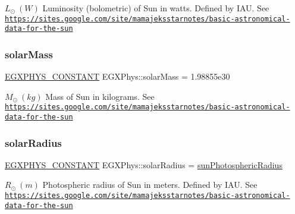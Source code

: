 $ L_{\odot} \ (W)$ Luminosity (bolometric) of Sun in watts. Defined by I\+AU. See \href{https://sites.google.com/site/mamajeksstarnotes/basic-astronomical-data-for-the-sun}{\tt https\+://sites.\+google.\+com/site/mamajeksstarnotes/basic-\/astronomical-\/data-\/for-\/the-\/sun} \mbox{\label{group___e_g_x_phys-_constants-_astrophysics-_solar_system-_sun-_bulk_gac1786f38c6e150937d1c83e4aa499a58}} 
\subsubsection{\texorpdfstring{solar\+Mass}{solarMass}}
{\footnotesize\ttfamily \mbox{\hyperlink{group___e_g_x_phys-_constants-_macros_ga76980d288494ce1714c9ac68a95ba702}{E\+G\+X\+P\+H\+Y\+S\+\_\+\+C\+O\+N\+S\+T\+A\+NT}} E\+G\+X\+Phys\+::solar\+Mass = 1.\+98855e30}

$M_{\odot} \ (kg)$ Mass of Sun in kilograms. See \href{https://sites.google.com/site/mamajeksstarnotes/basic-astronomical-data-for-the-sun}{\tt https\+://sites.\+google.\+com/site/mamajeksstarnotes/basic-\/astronomical-\/data-\/for-\/the-\/sun} \mbox{\label{group___e_g_x_phys-_constants-_astrophysics-_solar_system-_sun-_bulk_gaa98fc533653b96e0ae42262027723d6c}} 
\subsubsection{\texorpdfstring{solar\+Radius}{solarRadius}}
{\footnotesize\ttfamily \mbox{\hyperlink{group___e_g_x_phys-_constants-_macros_ga76980d288494ce1714c9ac68a95ba702}{E\+G\+X\+P\+H\+Y\+S\+\_\+\+C\+O\+N\+S\+T\+A\+NT}} E\+G\+X\+Phys\+::solar\+Radius = \mbox{\hyperlink{group___e_g_x_phys-_constants-_astrophysics-_solar_system-_sun-_bulk_gac257be308fa17adaf47f3310c5c65377}{sun\+Photospheric\+Radius}}}

$ R_{\odot} \ (m)$ Photospheric radius of Sun in meters. Defined by I\+AU. See \href{https://sites.google.com/site/mamajeksstarnotes/basic-astronomical-data-for-the-sun}{\tt https\+://sites.\+google.\+com/site/mamajeksstarnotes/basic-\/astronomical-\/data-\/for-\/the-\/sun} \mbox{\label{group___e_g_x_phys-_constants-_astrophysics-_solar_system-_sun-_bulk_gaa3846a73b10df493a64f08114333d67c}} 
